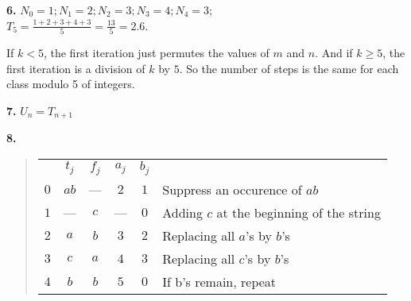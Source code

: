 \documentclass[a4paper,12pt]{article}
\begin{document}
\bigskip
\noindent
\textbf{6.} $N_0 = 1; N_1 = 2; N_2 = 3; N_3 = 4; N_4 = 3;$ \\
$T_5 = \frac{1+2+3+4+3}{5} = \frac{13}{5} = 2.6$.

\medskip
If $k < 5$, the first iteration just permutes the values of $m$ and $n$.
And if $k \ge 5$, the first iteration is a division of $k$ by $5$.
So the number of steps is the same for each class modulo 5 of integers.

\bigskip
\noindent
\textbf{7.} $U_n = T_{n+1}$

\bigskip
\noindent
\textbf{8.}
\begin{quote}
\begin{tabular}{|c|c|c|c|c|l}
\cline{1-5}
&$t_j$&$f_j$&$a_j$&$b_j$\\
\cline{1-5}
$0$&$ab$&---&$2$&$1$&Suppress an occurence of $ab$\\
\cline{1-5}
$1$&---&$c$&---&$0$&Adding $c$ at the beginning of the string\\
\cline{1-5}
$2$&$a$&$b$&$3$&$2$&Replacing all $a$'s by $b$'s\\
\cline{1-5}
$3$&$c$&$a$&$4$&$3$&Replacing all $c$'s by $b$'s\\
\cline{1-5}
$4$&$b$&$b$&$5$&$0$&If b's remain, repeat\\
\cline{1-5}
\end{tabular}
\end{quote}
\end{document}
